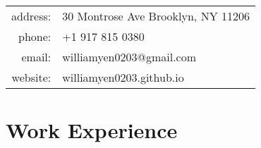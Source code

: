 \documentclass[letterpaper,10pt]{article} %
\begin{document}
\pagestyle{empty} %



\par{\bigskip\par} %


\begin{center}
\begin{tabular}{rl}
address: & 30 Montrose Ave Brooklyn, NY 11206 \\
phone: & +1 917 815 0380\\
email: & williamyen0203@gmail.com \\
website: & williamyen0203.github.io
\end{tabular}
\end{center}


\section{Work Experience}
\end{document}
